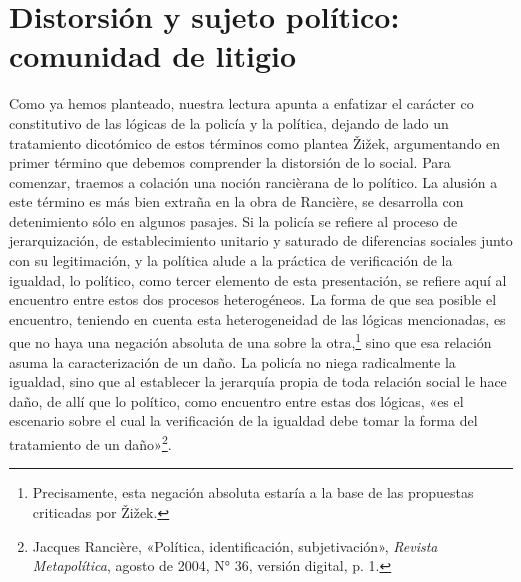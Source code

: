 \section{Distorsión y sujeto político: comunidad de litigio}

Como ya hemos planteado, nuestra lectura apunta a enfatizar el carácter co constitutivo de las lógicas de la policía y la política, dejando de lado un tratamiento dicotómico de estos términos como plantea Žižek, argumentando en primer término que debemos comprender la distorsión de lo social. Para comenzar, traemos a colación una noción rancièrana de lo político. La alusión a este término es más bien extraña en la obra de Rancière, se desarrolla con detenimiento sólo en algunos pasajes. Si la policía se refiere al proceso de jerarquización, de establecimiento unitario y saturado de diferencias sociales junto con su legitimación, y la política alude a la práctica de verificación de la igualdad, lo político, como tercer elemento de esta presentación, se refiere aquí al encuentro entre estos dos procesos heterogéneos. La forma de que sea posible el encuentro, teniendo en cuenta esta heterogeneidad de las lógicas mencionadas, es que no haya una negación absoluta de una sobre la otra,\footnote{Precisamente, esta negación absoluta estaría a la base de las propuestas criticadas por Žižek.} sino que esa relación asuma la caracterización de un daño. La policía no niega radicalmente la igualdad, sino que al establecer la jerarquía propia de toda relación social le hace daño, de allí que lo político, como encuentro entre estas dos lógicas, «es el escenario sobre el cual la verificación de la igualdad debe tomar la forma del tratamiento de un daño»\footnote{Jacques Rancière, «Política, identificación, subjetivación», \emph{Revista Metapolítica}, agosto de 2004, N° 36, versión digital, p. 1.}.

